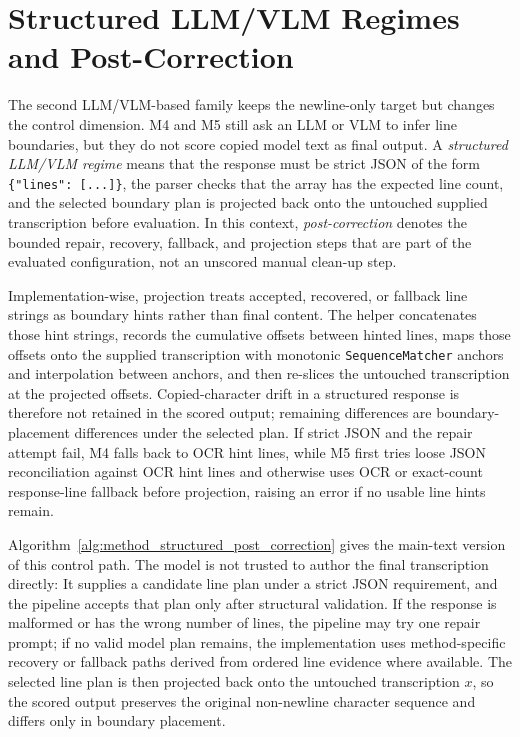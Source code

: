 \section{Structured LLM/VLM Regimes and Post-Correction}
\label{sec:method_structured_regimes}

The second LLM/VLM-based family keeps the newline-only target but changes the control dimension. M4 and M5 still ask an LLM or VLM to infer line boundaries, but they do not score copied model text as final output. A \emph{structured LLM/VLM regime} means that the response must be strict JSON of the form \texttt{\{"lines": [...]\}}, the parser checks that the array has the expected line count, and the selected boundary plan is projected back onto the untouched supplied transcription before evaluation. In this context, \emph{post-correction} denotes the bounded repair, recovery, fallback, and projection steps that are part of the evaluated configuration, not an unscored manual clean-up step.

Implementation-wise, projection treats accepted, recovered, or fallback line strings as boundary hints rather than final content. The helper concatenates those hint strings, records the cumulative offsets between hinted lines, maps those offsets onto the supplied transcription with monotonic \texttt{SequenceMatcher} anchors and interpolation between anchors, and then re-slices the untouched transcription at the projected offsets. Copied-character drift in a structured response is therefore not retained in the scored output; remaining differences are boundary-placement differences under the selected plan. If strict JSON and the repair attempt fail, M4 falls back to OCR hint lines, while M5 first tries loose JSON reconciliation against OCR hint lines and otherwise uses OCR or exact-count response-line fallback before projection, raising an error if no usable line hints remain.

Algorithm~\ref{alg:method_structured_post_correction} gives the main-text version of this control path. The model is not trusted to author the final transcription directly: It supplies a candidate line plan under a strict JSON requirement, and the pipeline accepts that plan only after structural validation. If the response is malformed or has the wrong number of lines, the pipeline may try one repair prompt; if no valid model plan remains, the implementation uses method-specific recovery or fallback paths derived from ordered line evidence where available. The selected line plan is then projected back onto the untouched transcription \(x\), so the scored output preserves the original non-newline character sequence and differs only in boundary placement.

